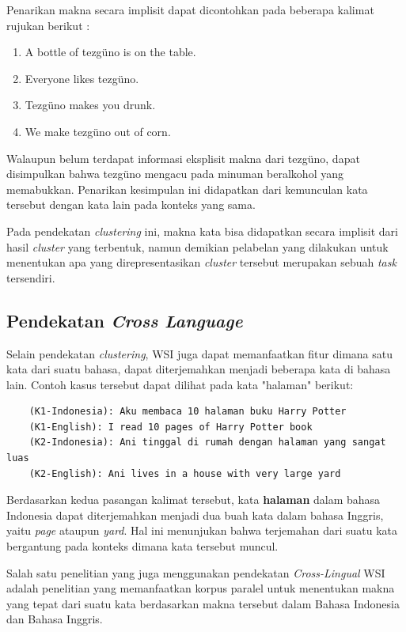 	Penarikan makna secara implisit dapat dicontohkan pada beberapa kalimat rujukan berikut \citep{denkowski2009survey}:
	
	\begin{enumerate}
		\item A bottle of tezg\"{u}no is on the table.
		\item Everyone likes tezg\"{u}no.
		\item Tezg\"{u}no makes you drunk.
		\item We make tezg\"{u}no out of corn.
	\end{enumerate}
	
	Walaupun belum terdapat informasi eksplisit makna dari tezg\"{u}no, dapat disimpulkan bahwa tezg\"{u}no mengacu pada minuman beralkohol yang memabukkan. Penarikan kesimpulan ini didapatkan dari kemunculan kata tersebut dengan kata lain pada konteks yang sama.
	
	Pada pendekatan \textit{clustering} ini, makna kata bisa didapatkan secara implisit dari hasil \textit{cluster} yang terbentuk, namun demikian pelabelan yang dilakukan untuk menentukan apa yang direpresentasikan \textit{cluster} tersebut merupakan sebuah \textit{task} tersendiri.
	
	\subsection{Pendekatan \textit{Cross Language}}
	Selain pendekatan \textit{clustering}, WSI juga dapat memanfaatkan fitur dimana satu kata dari suatu bahasa, dapat diterjemahkan menjadi beberapa kata di bahasa lain. Contoh kasus tersebut dapat dilihat pada kata "halaman" berikut:

	\begin{lstlisting}
	(K1-Indonesia): Aku membaca 10 halaman buku Harry Potter
	(K1-English): I read 10 pages of Harry Potter book
	(K2-Indonesia): Ani tinggal di rumah dengan halaman yang sangat luas
	(K2-English): Ani lives in a house with very large yard
	\end{lstlisting}
	
	Berdasarkan kedua pasangan kalimat tersebut, kata \textbf{halaman} dalam bahasa Indonesia dapat diterjemahkan menjadi dua buah kata dalam bahasa Inggris, yaitu \textit{page} ataupun \textit{yard}. Hal ini menunjukan bahwa terjemahan dari suatu kata bergantung pada konteks dimana kata tersebut muncul.
	
	Salah satu penelitian yang juga menggunakan pendekatan \textit{Cross-Lingual} WSI adalah penelitian \citep{septiantri2013wsd} yang memanfaatkan korpus paralel untuk menentukan makna yang tepat dari suatu kata berdasarkan makna tersebut dalam Bahasa Indonesia dan Bahasa Inggris.


